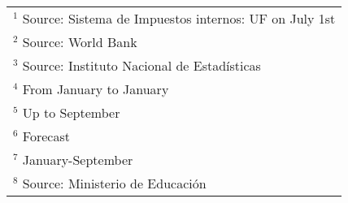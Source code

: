 \begin{tabular}{lrrrrrr}
\multicolumn{7}{l}{$^1$ Source: Sistema de Impuestos internos: UF on July 1st}\\        
\multicolumn{7}{l}{$^2$ Source: World Bank}\\
\multicolumn{7}{l}{$^3$ Source: Instituto Nacional de Estadísticas}\\
\multicolumn{7}{l}{$^4$ From January to January}\\
\multicolumn{7}{l}{$^5$ Up to September}\\
\multicolumn{7}{l}{$^6$ Forecast}\\
\multicolumn{7}{l}{$^7$ January-September}\\
\multicolumn{7}{l}{$^8$ Source: Ministerio de Educación}\\
\hline
\end{tabular}
















